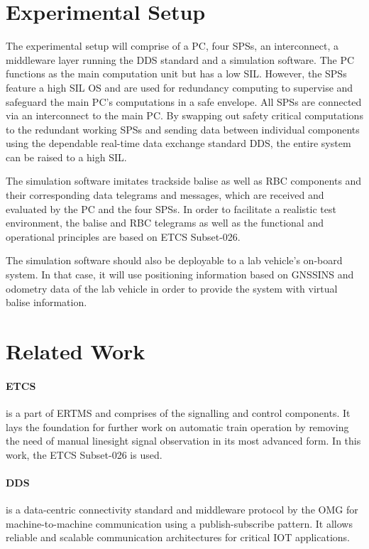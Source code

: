 \documentclass[a4paper, 12pt]{scrartcl}
\begin{document}
\section*{Experimental Setup}
The experimental setup will comprise of a PC, four \acp{SPS}, an interconnect, a middleware layer running the \ac{DDS} standard and a simulation software.
The PC functions as the main computation unit but has a low \ac{SIL}.
However, the \acp{SPS} feature a high \ac{SIL} \ac{OS} and are used for redundancy computing to supervise and safeguard the main PC's computations in a safe envelope.
All \acp{SPS} are connected via an interconnect to the main PC.
By swapping out safety critical computations to the redundant working \acp{SPS} and sending data between individual components using the dependable real-time data exchange standard \ac{DDS}, the entire system can be raised to a high \ac{SIL}.

The simulation software imitates trackside balise as well as \ac{RBC} components and their corresponding data telegrams and messages, which are received and evaluated by the PC and the four \acp{SPS}.
In order to facilitate a realistic test environment, the balise and \ac{RBC} telegrams as well as the functional and operational principles are based on \ac{ETCS} Subset-026.

The simulation software should also be deployable to a lab vehicle's on-board system.
In that case, it will use positioning information based on \ac{GNSSINS} and odometry data of the lab vehicle in order to provide the system with virtual balise information.

\section*{Related Work}
\paragraph{\ac{ETCS}} is a part of \ac{ERTMS} and comprises of the signalling and control components.
It lays the foundation for further work on automatic train operation by removing the need of manual linesight signal observation in its most advanced form.
In this work, the \ac{ETCS} Subset-026 is used.
\vspace{-0.4cm}
\paragraph{\ac{DDS}} is a data-centric connectivity standard and middleware protocol by the \ac{OMG} for machine-to-machine communication using a publish-subscribe pattern.
It allows reliable and scalable communication architectures for critical \ac{IOT} applications.
\vspace{-0.4cm}
\end{document}

